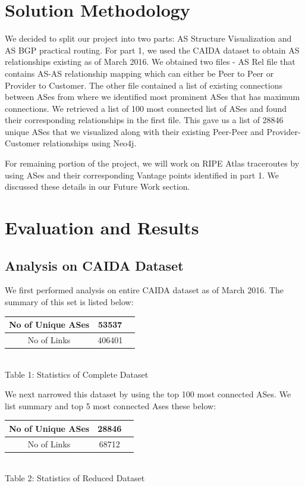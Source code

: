 \documentclass{sig-alternate-05-2015}
\begin{document}
\section{Solution Methodology}

We decided to split our project into two parts: AS Structure Visualization and AS BGP practical routing. For part 1, we used the CAIDA dataset to obtain AS relationships existing as of March 2016. We obtained two files - AS Rel file that contains AS-AS relationship mapping which can either be Peer to Peer or Provider to Customer. The other file contained a list of existing connections between ASes from where we identified most prominent ASes that has maximum connections. We retrieved a list of 100 most connected list of ASes and found their corresponding relationships in the first file. This gave us a list of 28846 unique ASes that we visualized along with their existing Peer-Peer and Provider-Customer relationships using Neo4j.

For remaining portion of the project, we will work on RIPE Atlas traceroutes by using ASes and their corresponding Vantage points identified in part 1. We discussed these details in our Future Work section.

\section{Evaluation and Results}
\subsection{Analysis on CAIDA Dataset}
We first performed analysis on entire CAIDA dataset as of March 2016. The summary of this set is listed below:

\begin{center}
\begin{tabular}{ |c|c|c| } 
 \hline
 No of Unique ASes & 53537 \\ 
 \hline
 No of Links & 406401 \\ 
 \hline
\end{tabular}
\\Table 1: Statistics of Complete Dataset\\
\end{center}

We next narrowed this dataset by using the top 100 most connected ASes. We list summary and top 5 most connected Ases these below:

\begin{center}
\begin{tabular}{ |c|c|c| } 
 \hline
 No of Unique ASes & 28846 \\ 
 \hline
 No of Links & 68712 \\ 
 \hline
\end{tabular}
\\Table 2: Statistics of Reduced Dataset\\
\end{center}
\end{document}
